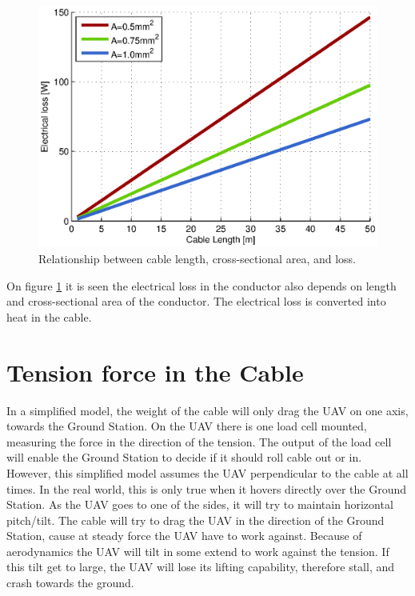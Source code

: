 \begin{figure}[hbtp]
\centering
\includegraphics[scale=1]{graphics/matlab/cable_relation_lenght_loss_crosssection.eps}
\caption[Relationship between cable length, cross-sectional area and cable loss.]{Relationship between cable length, cross-sectional area, and  loss.}
\label{fig:relationship_loss_length}
\end{figure}


\noindent
On figure \ref{fig:relationship_loss_length} it is seen the electrical loss in the conductor also depends on length and cross-sectional area of the conductor. The electrical loss is converted into heat in the cable.

\newpage
\section{Tension force in the Cable}

\noindent
In a simplified model, the weight of the cable will only drag the UAV on one axis, towards the Ground Station. On the UAV there is one load cell mounted, measuring the force in the direction of the tension. The output of the load cell will enable the Ground Station to decide if it should roll cable out or in. However, this simplified model assumes the UAV perpendicular to the cable at all times. 
In the real world, this is only true when it hovers directly over the Ground Station. As the UAV goes to one of the sides, it will try to maintain horizontal pitch/tilt. The cable will try to drag the UAV in the direction of the Ground Station, cause at steady force the UAV have to work against. Because of aerodynamics the UAV will tilt in some extend to work against the tension. If this tilt get to large, the UAV will lose its lifting capability, therefore stall, and crash towards the ground.


